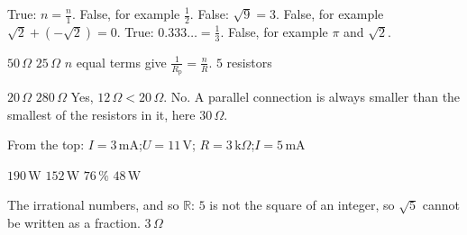 \begin{facit}
  True: $n = \frac{n}{1}$.
 False, for example $\frac{1}{2}$.
 False: $\sqrt{9} = 3$.
 False, for example $\sqrt{2} + (-\sqrt{2}) = 0$.
 True: $0.333\ldots = \frac{1}{3}$.
 False, for example $\pi$ and $\sqrt{2}$.

  $50\,\Omega$  $25\,\Omega$
 $n$ equal terms give $\frac{1}{R_{\text{p}}} = \frac{n}{R}$.
 $5$ resistors

  $20\,\Omega$  $280\,\Omega$  Yes, $12\,\Omega < 20\,\Omega$.
 No. A parallel connection is always smaller than the smallest of the resistors in it, here
$30\,\Omega$.

 From the top: $I = 3\,\text{mA}$;\enspace $U = 11\,\text{V}$;\enspace
$R = 3\,\text{k}\Omega$;\enspace $I = 5\,\text{mA}$

  $190\,\text{W}$  $152\,\text{W}$  $76\,\%$  $48\,\text{W}$

  The irrational numbers, and so $\mathbb{R}$: $5$ is not the square
of an integer, so $\sqrt{5}$ cannot be written as a fraction.
 $3\,\Omega$

\end{facit}
